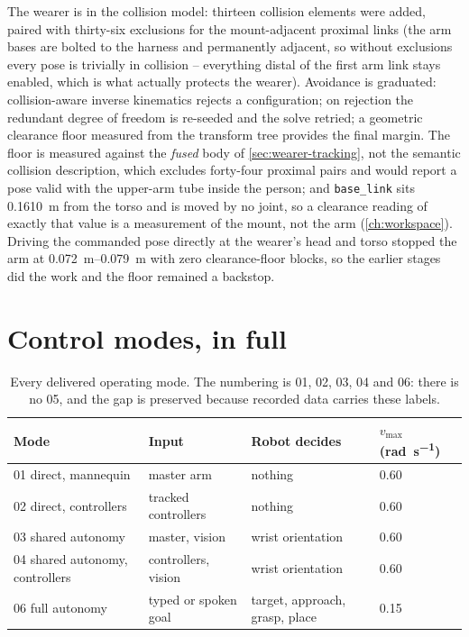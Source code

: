 The wearer is in the collision model: thirteen collision elements were
added, paired with thirty-six exclusions for the mount-adjacent proximal
links (the arm bases are bolted to the harness and permanently adjacent, so
without exclusions every pose is trivially in collision -- everything distal
of the first arm link stays enabled, which is what actually protects the
wearer). Avoidance is graduated: collision-aware inverse kinematics rejects
a configuration; on rejection the redundant degree of freedom is re-seeded
and the solve retried; a geometric clearance floor measured from the
transform tree provides the final margin. The floor is measured against the
\emph{fused} body of \cref{sec:wearer-tracking}, not the semantic collision
description, which excludes forty-four proximal pairs and would report a
pose valid with the upper-arm tube inside the person; and
\texttt{base\_link} sits \SI{0.1610}{\metre} from the torso and is moved by
no joint, so a clearance reading of exactly that value is a measurement of
the mount, not the arm (\cref{ch:workspace}). Driving the commanded pose
directly at the wearer's head and torso stopped the arm at
\SIrange{0.072}{0.079}{\metre} with zero clearance-floor blocks, so the
earlier stages did the work and the floor remained a backstop.

\section{Control modes, in full}

\begin{table}[htbp]
  \centering
  \small
  \caption{Every delivered operating mode. The numbering is 01, 02, 03, 04
  and 06: there is no 05, and the gap is preserved because recorded data
  carries these labels.}
  \label{tab:modes}
  \begin{tabular}{@{}llll@{}}
    \toprule
    Mode & Input & Robot decides & $v_{\max}$ (\si{\radian\per\second}) \\
    \midrule
    01 direct, mannequin & master arm & nothing & 0.60 \\
    02 direct, controllers & tracked controllers & nothing & 0.60 \\
    03 shared autonomy & master, vision & wrist orientation & 0.60 \\
    04 shared autonomy, controllers & controllers, vision & wrist orientation & 0.60 \\
    06 full autonomy & typed or spoken goal & target, approach, grasp, place & 0.15 \\
    \bottomrule
  \end{tabular}
\end{table}

